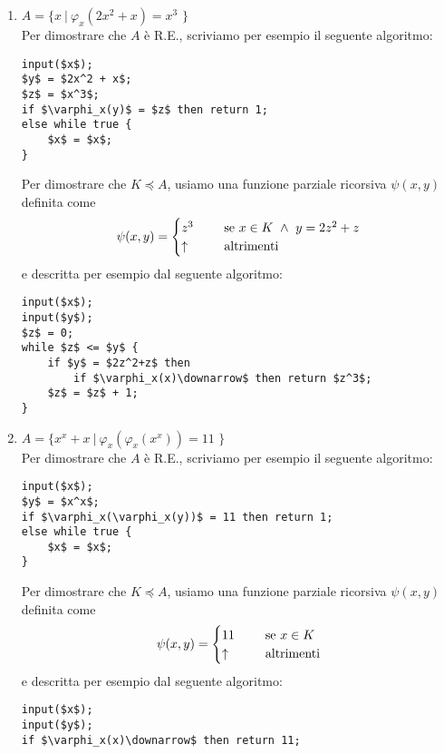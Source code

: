 \documentclass[a4paper,oneside,titlepage]{book}
\begin{document}
\begin{enumerate}[label=\fbox{\arabic*}]
\item $A = \text{\{ } x \ | \ \varphi_x(2x^2+x)=x^3 \text{ \}}$
\\ Per dimostrare che $A$ è R.E., scriviamo per esempio il seguente algoritmo:
\begin{lstlisting}
input($x$);
$y$ = $2x^2 + x$;
$z$ = $x^3$;
if $\varphi_x(y)$ = $z$ then return 1;
else while true {
    $x$ = $x$;
}
\end{lstlisting}
Per dimostrare che $K \preceq A$, usiamo una funzione parziale ricorsiva $\psi(x,y)$ definita come
\[
\psi(x,y) =
\begin{cases}
z^3& \hspace{0.5cm} \text{se } x \in K \ \wedge \ y = 2z^2+z \\
\uparrow& \hspace{0.5cm} \text{altrimenti}
\end{cases}
\]
e descritta per esempio dal seguente algoritmo:
\begin{lstlisting}
input($x$);
input($y$);
$z$ = 0;
while $z$ <= $y$ {
    if $y$ = $2z^2+z$ then
        if $\varphi_x(x)\downarrow$ then return $z^3$;
    $z$ = $z$ + 1;
}
\end{lstlisting}

\item $A = \text{\{ } x^x + x \ | \ \varphi_x(\varphi_x(x^x))=11 \text{ \}}$
\\ Per dimostrare che $A$ è R.E., scriviamo per esempio il seguente algoritmo:
\begin{lstlisting}
input($x$);
$y$ = $x^x$;
if $\varphi_x(\varphi_x(y))$ = 11 then return 1;
else while true {
    $x$ = $x$;
}
\end{lstlisting}
Per dimostrare che $K \preceq A$, usiamo una funzione parziale ricorsiva $\psi(x,y)$ definita come
\[
\psi(x,y) =
\begin{cases}
11& \hspace{0.5cm} \text{se } x \in K \\
\uparrow& \hspace{0.5cm} \text{altrimenti}
\end{cases}
\]
e descritta per esempio dal seguente algoritmo:
\begin{lstlisting}[frame=tb]
input($x$);
input($y$);
if $\varphi_x(x)\downarrow$ then return 11;
\end{lstlisting}


\end{enumerate}
\end{document}
